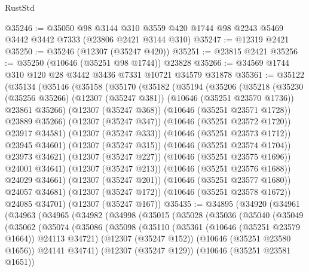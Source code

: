 \begin{lexlean}{RustStd}
\begin{coremodule}
@35246 := @35050
    @98
    @3144
    @310
    @3559
    @420
    @1744
    @98
    @2243
    @5469
    @3442
    @3442
    @7333
    (@23806 @2421 @3144 @310)
@35247 := @12319 @2421
@35250 := @35246 (@12307 (@35247 @420))
@35251 := @23815 @2421
@35256 := @35250 (@10646 (@35251 @98 @1744)) @23828
@35266 := @34569 @1744 @310 @120 @28 @3442 @3436 @7331 @10721 @34579 @31878
@35361 := @35122
    (@35134
      (@35146
        (@35158
          (@35170
            (@35182
              (@35194
                (@35206
                  (@35218
                    (@35230
                      (@35256 @35266)
                      (@12307 (@35247 @381))
                      (@10646 (@35251 @23570 @1736))
                      @23861
                      @35266)
                    (@12307 (@35247 @368))
                    (@10646 (@35251 @23571 @1728))
                    @23889
                    @35266)
                  (@12307 (@35247 @347))
                  (@10646 (@35251 @23572 @1720))
                  @23917
                  @34581)
                (@12307 (@35247 @333))
                (@10646 (@35251 @23573 @1712))
                @23945
                @34601)
              (@12307 (@35247 @315))
              (@10646 (@35251 @23574 @1704))
              @23973
              @34621)
            (@12307 (@35247 @227))
            (@10646 (@35251 @23575 @1696))
            @24001
            @34641)
          (@12307 (@35247 @213))
          (@10646 (@35251 @23576 @1688))
          @24029
          @34661)
        (@12307 (@35247 @201))
        (@10646 (@35251 @23577 @1680))
        @24057
        @34681)
      (@12307 (@35247 @172))
      (@10646 (@35251 @23578 @1672))
      @24085
      @34701)
    (@12307 (@35247 @167))
@35435 := @34895
    (@34920
      (@34961
        (@34963
          (@34965
            (@34982
              (@34998
                (@35015
                  (@35028
                    (@35036
                      (@35040
                        (@35049
                          (@35062
                            (@35074
                              (@35086
                                (@35098
                                  (@35110
                                    (@35361 (@10646 (@35251 @23579 @1664)) @24113 @34721)
                                    (@12307 (@35247 @152))
                                    (@10646 (@35251 @23580 @1656))
                                    @24141
                                    @34741)
                                  (@12307 (@35247 @129))
                                  (@10646 (@35251 @23581 @1651))

\end{coremodule}
\end{lexlean}
